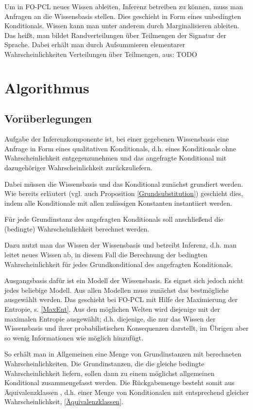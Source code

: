 \documentclass[a4paper, 11pt]{book}
\begin{document}
Um in FO-PCL neues Wissen ableiten,  Inferenz betreiben zu können, muss man Anfragen an die Wissensbasis stellen. Dies geschieht in Form eines unbedingten Konditionals. Wissen kann man unter anderem durch Marginalisieren ableiten. Das heißt, man bildet Randverteilungen über Teilmengen der Signatur der Sprache. Dabei erhält man durch Aufsummieren elementarer Wahrscheinlichkeiten Verteilungen über Teilmengen, aus: \cite[Anhang A.2]{BKI08}
TODO


\chapter{Algorithmus} \label{Alg}

\section{Vorüberlegungen}
Aufgabe der Inferenzkomponente ist, bei einer gegebenen Wissensbasis eine Anfrage in Form eines qualitativen Konditionals, d.h. eines Konditionals ohne Wahrscheinlichkeit entgegenzunehmen und das angefragte Konditional mit dazugehöriger Wahrscheinlichkeit zurückzuliefern.

Dabei müssen die Wissensbasis und das Konditional zunächst grundiert werden. Wie bereits erläutert (vgl. auch Proposition \ref{Grundsubstitution}) geschieht dies, indem alle Konditionale mit allen zulässigen Konstanten instantiiert werden.

Für jede Grundinstanz des angefragten Konditionals soll anschließend die (bedingte) Wahrscheinlichkeit berechnet werden.

Dazu nutzt man das Wissen der Wissensbasis und betreibt Inferenz, d.h. man leitet neues Wissen ab,  in diesem Fall die Berechnung der bedingten Wahrscheinlichkeit für jedes Grundkonditional des angefragten Konditionals.

Ausgangsbasis dafür ist ein Modell der Wissensbasis. Es eignet sich jedoch nicht jedes beliebige Modell. Aus allen Modellen muss zunächst das bestmögliche ausgewählt werden.
Das geschieht bei FO-PCL mit Hilfe der Maximierung der Entropie, s. \ref{MaxEnt}. Aus den möglichen Welten wird diejenige mit der maximalen Entropie ausgewählt; d.h. diejenige, die nur das Wissen der Wissensbasis und ihrer probabilistischen Konsequenzen darstellt, im Übrigen aber so wenig Informationen wie möglich hinzufügt.

So erhält man in Allgemeinen eine Menge von Grundinstanzen mit berechneten Wahrscheinlichkeiten.
Die Grundinstanzen, die die gleiche bedingte Wahrscheinlichkeit liefern, sollen dann zu einem möglichst allgemeinen Konditional zusammengefasst werden. Die Rückgabemenge besteht somit aus Äquivalenzklassen  , d.h. einer Menge von Konditionalen mit entsprechend gleicher Wahrscheinlichkeit, \ref{Äquivalenzklassen}. 
\end{document}
